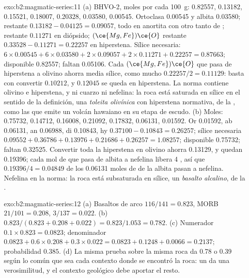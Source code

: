 \begin{solution}{exo:b2:magmatic-series:11}
(a) BHVO-2, moles por cada \qty{100}{g}:  0.82557,  0.13182, 
0.15521,  0.18007,  0.20328,  0.03580,  0.00545.
Ortoclasa 0.00545 y albita 0.03580;  restante $0.13182 - 0.04125 = 0.09057$,
todo en anortita con otro tanto de ;  restante $0.11271$ en diópsido;
$(\ce{Mg,Fe})\ce{O}$ restante $0.33528 - 0.11271 = 0.22257$ en hiperstena. Sílice
necesaria: $6\times0.00545 + 6\times0.03580 + 2\times0.09057 + 2\times0.11271 + 0.22257 =
0.87663$; disponible 0.82557; faltan 0.05106. Cada $(\ce{Mg,Fe})\ce{O}$ que pasa de
hiperstena a olivino ahorra media sílice, como mucho $0.22257/2 = 0.11129$: basta con convertir
$0.10212$, y $0.12045$ se queda en hiperstena. La norma contiene olivino
e hiperstena, y ni cuarzo ni nefelina: la roca está saturada en sílice en el
sentido de la definición, una \emph{toleita olivínica} con hiperstena normativa, de la
, como las que emite un volcán hawaiano en su etapa de escudo. (b) Moles: 0.75732, 0.14712, 0.16008, 0.21092, 0.17832, 0.06131,
0.01592. Or 0.01592, ab 0.06131, an 0.06988, di 0.10843, hy $0.37100 - 0.10843 =
0.26257$; sílice necesaria $0.09552 + 0.36786 + 0.13976 + 0.21686 + 0.26257 = 1.08257$;
disponible 0.75732; faltan 0.32525. Convertir toda la hiperstena en olivino ahorra
0.13129, y quedan 0.19396; cada mol de  que pasa de albita a nefelina
libera 4 , así que $0.19396/4 = 0.04849$
de los 0.06131 moles de  de la albita pasan a nefelina. Nefelina en la norma: la
roca está subsaturada en sílice, un \emph{basalto alcalino}, de la .
\end{solution}

\begin{solution}{exo:b2:magmatic-series:12}
(a) Basaltos de arco $116/141 = 0.823$, MORB $21/101 = 0.208$, 
$3/137 = 0.022$. (b) $0.823/(0.823 + 0.208 + 0.022) = 0.823/1.053 = 0.782$.
(c) Numerador $0.1\times0.823 = 0.0823$; denominador $0.0823 + 0.6\times0.208 +
0.3\times0.022 = 0.0823 + 0.1248 + 0.0066 = 0.2137$; probabilidad $0.385$. (d) La
misma prueba sobre la misma roca da 0.78 o 0.39 según lo común que sea cada contexto
donde se encontró la roca: un  da una verosimilitud, y el
contexto geológico debe aportar el resto.
\end{solution}

